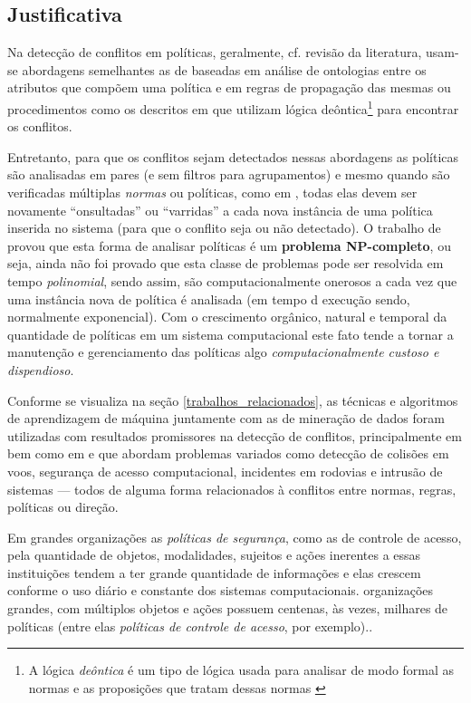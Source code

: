 \documentclass[
	12pt,				%
	openright,			%
	twoside,			%
	a4paper,			%
	english,			%
	french,				%
	spanish,			%
	brazil				%
	]{abntex2}
\begin{document}
\subsection{Justificativa}\label{justificativa}
Na detecção de conflitos em políticas, geralmente, cf. revisão da literatura,  usam-se abordagens semelhantes as de  baseadas em análise de ontologias entre os atributos que compõem uma política e em regras de propagação das mesmas ou procedimentos como os descritos em  que utilizam lógica deôntica\footnote{A lógica \textit{deôntica} é um tipo de lógica usada para analisar de modo formal as normas e as proposições que tratam dessas normas \cite{eduardo2017} } para encontrar os conflitos. 

Entretanto, para que os conflitos sejam detectados nessas abordagens as políticas são analisadas em pares (e sem filtros para agrupamentos) e mesmo quando são verificadas múltiplas \textit{normas} ou políticas, como em , todas elas devem ser novamente ``onsultadas'' ou ``varridas'' a cada nova instância de uma política inserida no sistema (para que o conflito seja ou não detectado). O trabalho de  provou que esta forma de analisar políticas é um \textbf{problema NP-completo}, ou seja, ainda não foi provado que esta classe de problemas pode ser resolvida em tempo \textit{polinomial}, sendo assim, são computacionalmente onerosos a cada vez que uma instância nova de política é analisada (em tempo d execução sendo, normalmente exponencial). Com o crescimento orgânico, natural e temporal da quantidade de políticas em um sistema computacional este fato tende a tornar a manutenção e gerenciamento das políticas algo \textit{computacionalmente custoso e dispendioso}.   

Conforme se visualiza na seção \ref{trabalhos_relacionados}, as técnicas e algoritmos de aprendizagem de máquina juntamente com as de mineração de dados foram utilizadas com resultados promissores na detecção de conflitos, principalmente em  bem como em  e  que abordam problemas variados como detecção de colisões em voos, segurança de acesso computacional, incidentes em rodovias e intrusão de sistemas --- todos de alguma forma relacionados à conflitos entre normas, regras, políticas ou direção.  

Em grandes organizações as \textit{políticas de segurança}, como as de controle de acesso, pela quantidade de objetos, modalidades, sujeitos e ações inerentes a essas instituições tendem a ter grande quantidade de informações e elas crescem conforme o uso diário e constante dos sistemas computacionais. organizações grandes, com múltiplos objetos e ações possuem centenas, às vezes, milhares de políticas (entre elas \textit{políticas de controle de acesso}, por exemplo).\cite{fugini_information_2004}.
\end{document}
